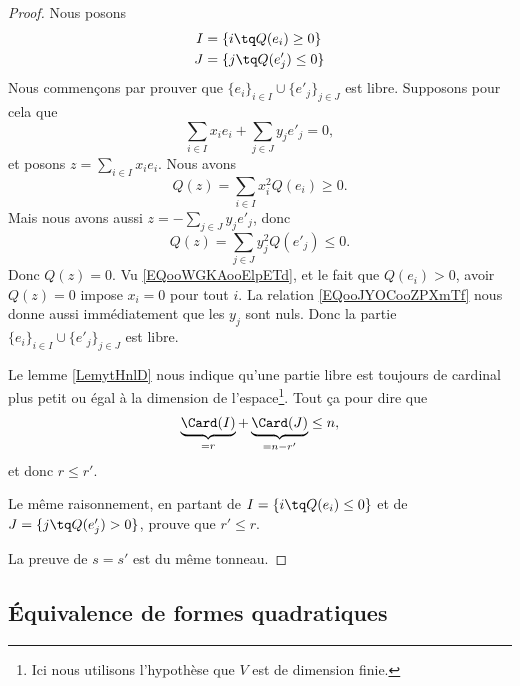 \begin{proof}
	Nous posons
	\begin{subequations}
		\begin{align}
			I & =\{ i\tq Q(e_i)\geq 0 \}  \\
			J & =\{ j\tq Q(e_j')\leq 0 \}
		\end{align}
	\end{subequations}
	Nous commençons par prouver que \( \{ e_i \}_{i\in I}\cup\{ e'_j \}_{j\in J}\) est libre. Supposons pour cela que
	\begin{equation}
		\sum_{i\in I}x_ie_i+\sum_{j\in J}y_je'_j=0,
	\end{equation}
	et posons \( z=\sum_{i\in I}x_ie_i\). Nous avons
	\begin{equation}        \label{EQooWGKAooElpETd}
		Q(z)=\sum_{i\in I}x_i^2Q(e_i)\geq 0.
	\end{equation}
	Mais nous avons aussi \( z=-\sum_{j\in J}y_je'_j\), donc
	\begin{equation}        \label{EQooJYOCooZPXmTf}
		Q(z)=\sum_{j\in J}y_j^2Q(e'_j)\leq 0.
	\end{equation}
	Donc \( Q(z)=0\). Vu \eqref{EQooWGKAooElpETd}, et le fait que \( Q(e_i)>0\), avoir \( Q(z)=0\) impose \( x_i=0\) pour tout \( i\). La relation \eqref{EQooJYOCooZPXmTf} nous donne aussi immédiatement que les \( y_j\) sont nuls. Donc la partie \( \{ e_i \}_{i\in I}\cup\{ e'_j \}_{j\in J}\) est libre.

	Le lemme \ref{LemytHnlD} nous indique qu'une partie libre est toujours de cardinal plus petit ou égal à la dimension de l'espace\footnote{Ici nous utilisons l'hypothèse que \( V\) est de dimension finie.}. Tout ça pour dire que
	\begin{equation}
		\underbrace{\Card(I)}_{=r}+\underbrace{\Card(J)}_{=n-r'}\leq n,
	\end{equation}
	et donc \( r\leq r'\).

	Le même raisonnement, en partant de \( I=\{ i\tq Q(e_i)\leq 0 \}\) et de \( J=\{ j\tq Q(e'_j)>0 \}\), prouve que \( r'\leq r\).

	La preuve de \( s=s'\) est du même tonneau.
\end{proof}

\subsection{Équivalence de formes quadratiques}

